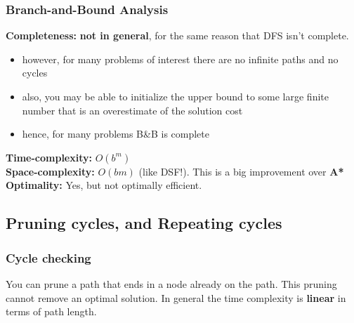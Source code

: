 \documentclass{article}
\theoremstyle{definition}
\begin{document}
\subsubsection*{Branch-and-Bound Analysis}
\textbf{\color{Magenta} Completeness:} \textbf{not in general}, for the same reason that DFS isn't complete. 
\begin{itemize}
	\item however, for many problems of interest there are no infinite paths and no cycles
	\item also, you may be able to initialize the upper bound to some large finite number that is an overestimate of the solution cost
	\item hence, for many problems B\&B is complete
\end{itemize}
\textbf{\color{Magenta} Time-complexity:} $ O(b^m) $\\
\textbf{\color{Magenta} Space-complexity:} $ O(bm) $ (like DSF!). This is a big improvement over \textbf{A*} \\
\textbf{\color{Magenta} Optimality:} Yes, but not optimally efficient.

\subsection*{Pruning cycles, and Repeating cycles}

\subsubsection*{Cycle checking}
You can prune a path that ends in a node already on the path. This pruning cannot remove an optimal solution. In general the time complexity is \textbf{\color{blue} linear} in terms of path length.
\end{document}

